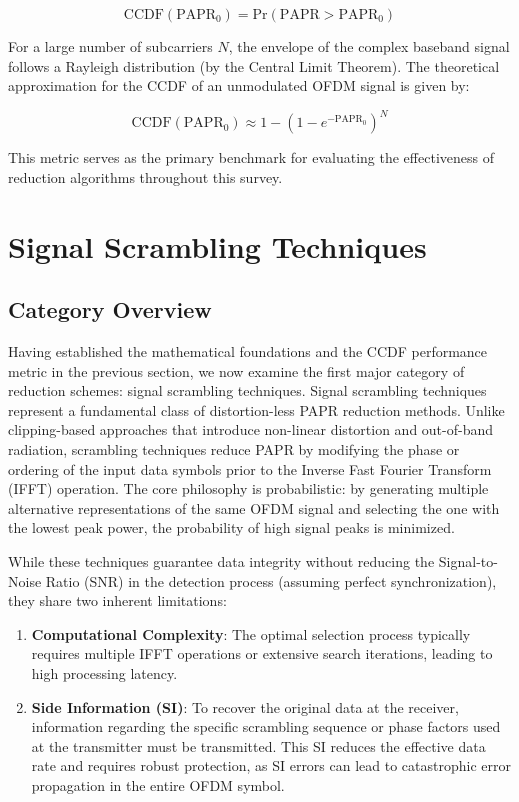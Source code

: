 \documentclass[journal]{IEEEtran}
\begin{document}
\begin{equation}
    \text{CCDF}(\text{PAPR}_0) = \text{Pr}(\text{PAPR} > \text{PAPR}_0)
\end{equation}

For a large number of subcarriers $N$, the envelope of the complex baseband signal follows a Rayleigh distribution (by the Central Limit Theorem). The theoretical approximation for the CCDF of an unmodulated OFDM signal is given by:

\begin{equation}
    \text{CCDF}(\text{PAPR}_0) \approx 1 - (1 - e^{-\text{PAPR}_0})^N
\end{equation}

This metric serves as the primary benchmark for evaluating the effectiveness of reduction algorithms throughout this survey.

\section{Signal Scrambling Techniques}

\subsection{Category Overview}
Having established the mathematical foundations and the CCDF performance metric in the previous section, we now examine the first major category of reduction schemes: signal scrambling techniques. Signal scrambling techniques represent a fundamental class of distortion-less PAPR reduction methods. Unlike clipping-based approaches that introduce non-linear distortion and out-of-band radiation, scrambling techniques reduce PAPR by modifying the phase or ordering of the input data symbols prior to the Inverse Fast Fourier Transform (IFFT) operation. The core philosophy is probabilistic: by generating multiple alternative representations of the same OFDM signal and selecting the one with the lowest peak power, the probability of high signal peaks is minimized.

While these techniques guarantee data integrity without reducing the Signal-to-Noise Ratio (SNR) in the detection process (assuming perfect synchronization), they share two inherent limitations:

\begin{enumerate}
    \item \textbf{Computational Complexity}: The optimal selection process typically requires multiple IFFT operations or extensive search iterations, leading to high processing latency.
    \item \textbf{Side Information (SI)}: To recover the original data at the receiver, information regarding the specific scrambling sequence or phase factors used at the transmitter must be transmitted. This SI reduces the effective data rate and requires robust protection, as SI errors can lead to catastrophic error propagation in the entire OFDM symbol.
\end{enumerate}
\end{document}

